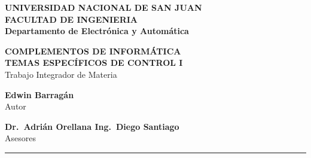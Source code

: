 \begin{titlepage}
  \begin{center}
    \begin{Large}
      \textbf{UNIVERSIDAD NACIONAL DE SAN JUAN\\
      \vspace*{0.05in}
      FACULTAD DE INGENIERIA\\
      \vspace*{0.05in}
      Departamento de Electrónica y Automática\\
      \vspace*{\fill}}
    \end{Large}
    \begin{Large}
      \textbf{COMPLEMENTOS DE INFORMÁTICA\\TEMAS ESPECÍFICOS DE CONTROL I} \\
      Trabajo Integrador de Materia\\
    \end{Large}
    \vspace*{\fill}
    \begin{large}
      \textbf{Edwin Barragán}\\
      Autor\\
    \end{large}
    \vspace*{0.5in}
    \begin{large}
      \textbf{Dr.~Adrián Orellana \hspace*{\fill}
      Ing.~Diego Santiago\\}
      Asesores\\
    \end{large}
    \vspace{\fill}
    \rule{80mm}{0.1mm}\\
    \vspace{.1in}
    \the\year
  \end{center}

\end{titlepage}
